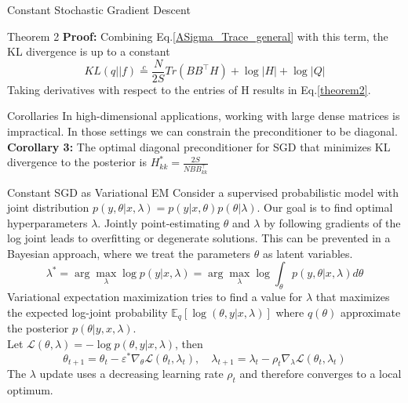 \documentclass{beamer}
\begin{document}
\begin{frame}{Constant Stochastic Gradient Descent}
    \begin{block}{Theorem 2}
        \textbf{Proof:} Combining Eq.\ref{ASigma_Trace_general} with this term, the KL divergence is up to a constant
        \begin{equation}
             KL(q||f) \overset{c}{=} \frac{N}{2S}Tr(BB^{\top}H) + \log |H| + \log |Q|
        \end{equation}
        Taking derivatives with respect to the entries of H results in Eq.\ref{theorem2}.
    \end{block}
    \begin{block}{Corollaries}
        In high-dimensional applications, working with large dense matrices is impractical. In those settings we can constrain the preconditioner to be diagonal. \\
        \textbf{Corollary 3:} The optimal diagonal preconditioner for SGD that minimizes KL divergence to the posterior is $H^*_{kk} = \frac{2S}{NBB^\top_{kk}}$
    \end{block}
\end{frame}

\begin{frame}{Constant SGD as Variational EM}
    Consider a supervised probabilistic model with joint distribution $p(y, \theta | x, \lambda) = p(y | x, \theta) p (\theta | \lambda)$. Our goal is to find optimal hyperparameters $\lambda$. Jointly point-estimating $\theta$ and $\lambda$ by following gradients of the log joint leads to overfitting or degenerate solutions. This can be prevented in a Bayesian approach, where we treat the parameters $\theta$ as latent variables.
    \[\lambda^* = \arg\max_{\lambda}\log p(y | x, \lambda) = \arg\max_{\lambda}\log\int_{\theta}p(y, \theta | x, \lambda)d\theta\]
    Variational expectation maximization tries to find a value for $\lambda$ that maximizes the expected log-joint probability $\mathbb{E}_q[\log(\theta, y | x, \lambda)]$ where $q(\theta)$ approximate the posterior $p(\theta | y, x, \lambda)$. \\
    Let $\mathcal{L}(\theta, \lambda) = -\log p(\theta, y | x, \lambda)$, then
    \begin{equation}\label{SGD_as_VEM}
        \theta_{t+1} = \theta_{t} - \varepsilon^* \nabla_{\theta}\mathcal{L}(\theta_t, \lambda_t), \quad \lambda_{t+1} = \lambda_{t} - \rho_t\nabla_{\lambda}\mathcal{L}(\theta_t, \lambda_t)
    \end{equation}
    The $\lambda$ update uses a decreasing learning rate $\rho_t$ and therefore converges to a local optimum.
\end{frame}
\end{document}
